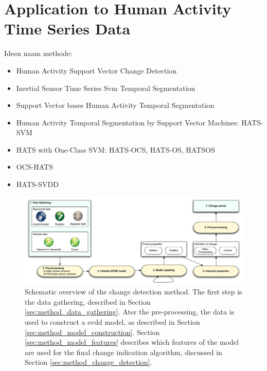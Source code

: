 
\chapter{Application to Human Activity Time Series Data}

\label{Chapter4} %


Ideen naam methode:
\begin{itemize}
  \item Human Activity Support Vector Change Detection
  \item Inertial Sensor Time Series Svm Temporal Segmentation
  \item Support Vector bases Human Activity Temporal Segmentation
  \item Human Activity Temporal Segmentation by Support Vector Machines: HATS-SVM
  \item HATS with One-Class SVM: HATS-OCS, HATS-OS, HATSOS
  \item OCS-HATS
  \item HATS-SVDD
\end{itemize}


\begin{figure}
  \centering
    \includegraphics[width=\textwidth]{./Figures/chapter4/method_setup.pdf}
  \caption[Method setup]{Schematic overview of the change detection method. The first step is the data gathering, described in Section \ref{sec:method_data_gathering}. Ater the pre-processing, the data is used to construct a \gls{svdd} model, as described in Section \ref{sec:method_model_construction}. Section \ref{sec:method_model_features} describes which features of the model are used for the final change indication algorithm, discussed in Section \ref{sec:method_change_detection}.}
  \label{fig:method_overview}
\end{figure}

